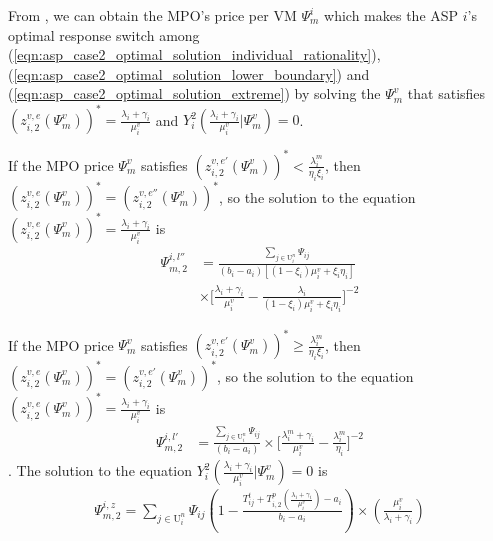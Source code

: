 \documentclass[10pt,journal, compsoc]{IEEEtran}
\begin{document}
From , we can obtain the MPO's price per VM $\Psi_m^i$ which makes the ASP $i$'s optimal response switch among (\ref{eqn:asp_case2_optimal_solution_individual_rationality}), (\ref{eqn:asp_case2_optimal_solution_lower_boundary}) and (\ref{eqn:asp_case2_optimal_solution_extreme}) by solving the $\Psi_m^v$ that satisfies $(z_{i,2}^{v,e}(\Psi_m^v))^* = \frac{\lambda_i+\gamma_i}{\mu_i^v}$ and  $Y_i^2(\frac{\lambda_i+\gamma_i}{\mu_i^v}|\Psi_m^v) = 0$.

If the MPO price $\Psi_m^v$ satisfies $(z_{i,2}^{v,e'}(\Psi_m^v))^* < \frac{\lambda_i^m}{\eta_i\xi_i}$, then $(z_{i,2}^{v,e}(\Psi_m^v))^* = (z_{i,2}^{v,e''}(\Psi_m^v))^*$, so the solution to the equation $(z_{i,2}^{v,e}(\Psi_m^v))^* = \frac{\lambda_i+\gamma_i}{\mu_i^v}$ is
\begin{equation}
\begin{aligned}
\Psi_{m,2}^{i,l''}&= \frac{\sum_{j \in \mathrm{U}_i^n}\Psi_{ij}}{(b_i-a_i)[(1-\xi_i)\mu_i^v + \xi_i \eta_i]}\\
&\times \big[\frac{\lambda_i+\gamma_i}{\mu_i^v} - \frac{\lambda_i}{(1-\xi_i)\mu_i^v + \xi_i\eta_i}\big]^{-2}
\end{aligned}
\end{equation}

If the MPO price $\Psi_m^v$ satisfies $(z_{i,2}^{v,e'}(\Psi_m^v))^* \geq \frac{\lambda_i^m}{\eta_i\xi_i}$, then $(z_{i,2}^{v,e}(\Psi_m^v))^* = (z_{i,2}^{v,e'}(\Psi_m^v))^*$, so the solution to the equation $(z_{i,2}^{v,e}(\Psi_m^v))^* = \frac{\lambda_i+\gamma_i}{\mu_i^v}$ is
\begin{equation}
\begin{aligned}
\Psi_{m,2}^{i,l'}&= \frac{\sum_{j \in \mathrm{U}_i^n}\Psi_{ij}}{(b_i-a_i)}  \times \big[\frac{\lambda_i^m+\gamma_i}{\mu_i^v}-\frac{\lambda_i^m}{\eta_i}\big]^{-2}
\end{aligned}
\end{equation}.
The solution to the equation $Y_i^2(\frac{\lambda_i+\gamma_i}{\mu_i^v}|\Psi_m^v) = 0$ is
\begin{equation}
\begin{aligned}
\Psi_{m,2}^{i,z}= 
\sum_{j \in \mathrm{U}_i^{n}}\Psi_{ij}(1-\frac{T_{ij}^t + T_{i,2}^p(\frac{\lambda_i+\gamma_i}{\mu_i^v})-a_i}{b_i-a_i})\times(\frac{\mu_i^v}{\lambda_i+\gamma_i})
\end{aligned}
\end{equation}
\end{document}
